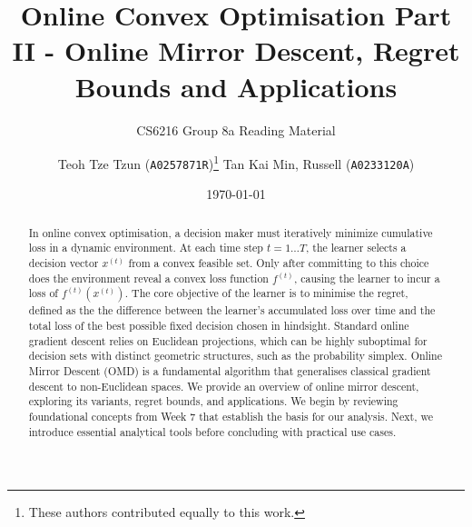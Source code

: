 \documentclass{article}
\title{Online Convex Optimisation Part II - Online Mirror Descent, Regret Bounds and Applications}
\subtitle{CS6216 Group 8a Reading Material}
\date{\today}
\author{
  Teoh Tze Tzun (\texttt{A0257871R})\thanks{These authors contributed equally to this work.} \qquad Tan Kai Min, Russell (\texttt{A0233120A})\footnotemark[1] 
}
\newcommand{\todo}[1]{{\color{red}\bfseries [TODO: #1]}}
\begin{document}
\maketitle


\begin{abstract}
    In online convex optimisation, a decision maker must iteratively minimize cumulative loss in a dynamic environment. At each time step $t=1\ldots T$, the learner selects a decision vector $x^{(t)}$ from a convex feasible set. Only after committing to this choice does the environment reveal a convex loss function $f^{(t)}$, causing the learner to incur a loss of $f^{(t)}(x^{(t)})$. The core objective of the learner is to minimise the regret, defined as the the difference between the learner's accumulated loss over time and the total loss of the best possible fixed decision chosen in hindsight. Standard online gradient descent relies on Euclidean projections, which can be highly suboptimal for decision sets with distinct geometric structures, such as the probability simplex. Online Mirror Descent (OMD) is a fundamental algorithm that generalises classical gradient descent to non-Euclidean spaces. We provide an overview of online mirror descent, exploring its variants, regret bounds, and applications. We begin by reviewing foundational concepts from Week 7 that establish the basis for our analysis. Next, we introduce essential analytical tools before concluding with practical use cases.
\end{abstract}
\end{document}
